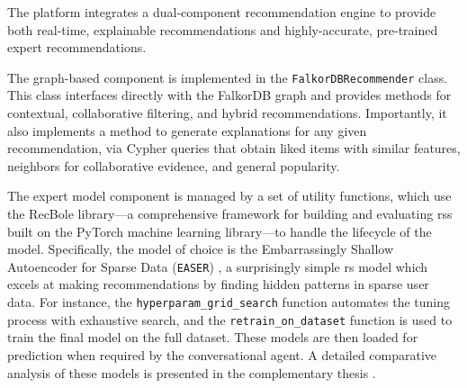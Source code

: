 The platform integrates a dual-component recommendation engine to provide both real-time, explainable recommendations and highly-accurate, pre-trained expert recommendations.

The graph-based component is implemented in the \texttt{FalkorDBRecommender} class. This class interfaces directly with the FalkorDB graph and provides methods for contextual, collaborative filtering, and hybrid recommendations. Importantly, it also implements a method to generate explanations for any given recommendation, via Cypher queries that obtain liked items with similar features, neighbors for collaborative evidence, and general popularity.

The expert model component is managed by a set of utility functions, which use the RecBole \cite{RECBOLE} library---a comprehensive framework for building and evaluating \aclp{rs} built on the PyTorch \cite{PYTORCH} machine learning library---to handle the lifecycle of the model. Specifically, the model of choice is the Embarrassingly Shallow Autoencoder for Sparse Data (\texttt{EASER}) \cite{EASER}, a surprisingly simple \acs{rs} model which excels at making recommendations by finding hidden patterns in sparse user data. For instance, the \texttt{hyperparam\_grid\_search} function automates the tuning process with exhaustive search, and the \texttt{retrain\_on\_dataset} function is used to train the final model on the full dataset. These models are then loaded for prediction when required by the conversational agent. A detailed comparative analysis of these models is presented in the complementary thesis \cite{MUI2ICSI_THESIS}.